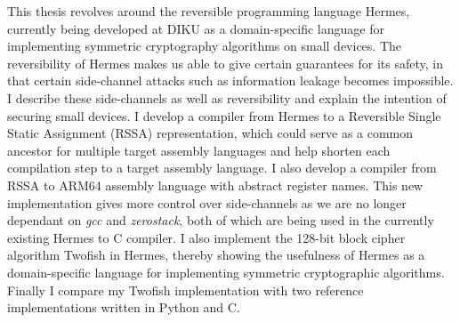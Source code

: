 This thesis revolves around the reversible programming language Hermes, currently being developed at DIKU as a domain-specific language for implementing symmetric cryptography algorithms on small devices.
The reversibility of Hermes makes us able to give certain guarantees for its safety, in that certain side-channel attacks such as information leakage becomes impossible.
I describe these side-channels as well as reversibility and explain the intention of securing small devices.
I develop a compiler from Hermes to a Reversible Single Static Assignment (RSSA) representation, which could serve as a common ancestor for multiple target assembly languages and help shorten each compilation step to a target assembly language.
I also develop a compiler from RSSA to ARM64 assembly language with abstract register names.
This new implementation gives more control over side-channels as we are no longer dependant on \emph{gcc} and \emph{zerostack}, both of which are being used in the currently existing Hermes to C compiler.
I also implement the 128-bit block cipher algorithm Twofish in Hermes, thereby showing the usefulness of Hermes as a domain-specific language for implementing symmetric cryptographic algorithms.
Finally I compare my Twofish implementation with two reference implementations written in Python and C.
